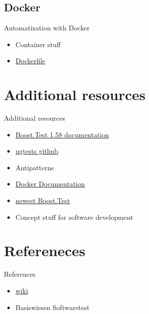 \documentclass{beamer}
\begin{document}
        \subsection{Docker}
        \begin{frame}{Automatization with Docker}
            \begin{itemize}
                \item Container stuff
                \item \href{https://github.com/Tobias-Trautmann/docker4ug4}{Dockerfile}
            \end{itemize}
        \end{frame}

    \section{Additional resources}
    \begin{frame}{Additional resources}
            \begin{itemize}
                \item \href{https://www.boost.org/doc/libs/1_58_0/libs/test/}{Boost.Test 1.58 documentation}
                \item \href{https://github.com/UG4/plugin_UGTest}{ugtests github}
                \item Antipatterns
                \item \href{https://docs.docker.com/}{Docker Documentation}
                \item \href{https://www.boost.org/doc/libs/1_73_0/libs/test/}{newest Boost.Test} %
                \item Concept stuff for software development
            \end{itemize}
    \end{frame}

    \section{Refereneces}
    \begin{frame}{References}
        \begin{itemize}
            \item \href{https://en.wikipedia.org/wiki/Software_testing}{wiki}
            \item Basiswissen Softwaretest
        \end{itemize}
    \end{frame}
\end{document}
